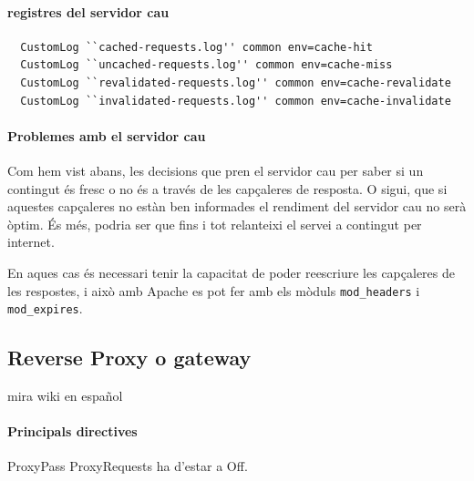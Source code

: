 \documentclass[a4paper, 11pt]{article}
\begin{document}
\paragraph{registres del servidor cau }

\begin{verbatim}
  CustomLog ``cached-requests.log'' common env=cache-hit
  CustomLog ``uncached-requests.log'' common env=cache-miss
  CustomLog ``revalidated-requests.log'' common env=cache-revalidate
  CustomLog ``invalidated-requests.log'' common env=cache-invalidate
\end{verbatim}


\paragraph{Problemes amb el servidor cau \\}

Com hem vist abans, les decisions que pren el servidor cau per saber si un contingut \'es fresc o no \'es a trav\'es de les capçaleres de resposta. O sigui, que si aquestes capçaleres no estàn ben informades el rendiment del servidor cau no serà òptim. \'Es m\'es, podria ser que fins i tot relanteixi el servei a contingut per internet.

En aques cas \'es necessari tenir la capacitat de poder reescriure les capçaleres de les respostes, i això amb Apache es pot fer amb els mòduls \verb+mod_headers+ i \verb+mod_expires+.




\subsection{Reverse Proxy o gateway}
mira wiki en español
\paragraph{Principals directives \\}
ProxyPass
ProxyRequests ha d'estar a Off.
\appendix
\end{document}
